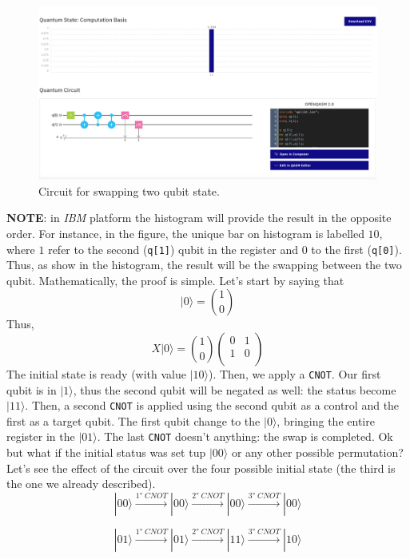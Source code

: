 \documentclass[a4paper,10pt]{article}
\begin{document}
\begin{figure}[!htb]
\begin{center}
\includegraphics[width=4.5in]{images/quantumSwap.png}
\caption{Circuit for swapping two qubit state.}
\label{fig:quantumSwap}
\end{center}
\end{figure}
\textbf{NOTE}: in \textit{IBM} platform the histogram will provide the result in the opposite order. For instance, in the figure, the unique bar on histogram is labelled $10$, where $1$ refer to the second (\texttt{q[1]}) qubit in the register and $0$ to the first (\texttt{q[0]}). Thus, as show in the histogram, the result will be the swapping between the two qubit. Mathematically, the proof is simple. Let's start by saying that
$$|0\rangle = \binom{1}{0}$$
Thus, 
$$X|0\rangle = \binom{1}{0}\left({\begin{matrix} 0 & 1 \\ 1 & 0 \\ \end{matrix}}\right)$$
The initial state is ready (with value $|10\rangle$). Then, we apply a \texttt{CNOT}. Our first qubit is in $|1\rangle$, thus the second qubit will be negated as well: the status become $|11\rangle$. Then, a second \texttt{CNOT} is applied using the second qubit as a control and the first as a target qubit. The first qubit change to the $|0\rangle$, bringing the entire register in the $|01\rangle$. The last \texttt{CNOT} doesn't anything: the swap is completed. Ok but what if the initial status was set tup $|00\rangle$ or any other possible permutation? Let's see the effect of the circuit over the four possible initial state (the third is the one we already described).
$$|00\rangle \xrightarrow{\ang{1} \; CNOT} |00\rangle \xrightarrow{\ang{2} \; CNOT} |00\rangle \xrightarrow{\ang{3} \; CNOT} |00\rangle$$

$$|01\rangle \xrightarrow{\ang{1} \; CNOT} |01\rangle \xrightarrow{\ang{2} \; CNOT} |11\rangle \xrightarrow{\ang{3} \; CNOT} |10\rangle$$
\end{document}
